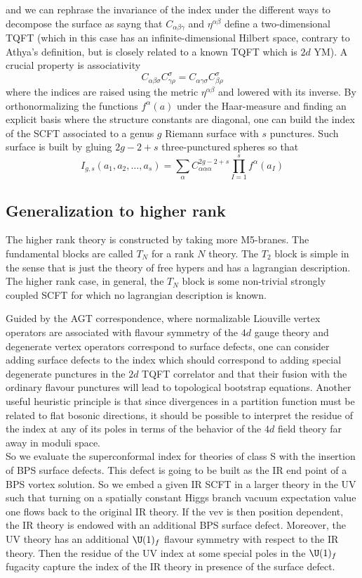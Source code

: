 and we can rephrase the invariance of the index under the different ways to decompose the surface as sayng that $C_{\alpha\beta\gamma}$ and $\eta^{\alpha\beta}$ define a two-dimensional TQFT (which in this case has an infinite-dimensional Hilbert space, contrary to Athya's definition, but is closely related to a known TQFT which is $2d$ YM). A crucial property is associativity
\begin{equation}
	C_{\alpha\beta\sigma}C^{\sigma}_{\gamma\rho}=C_{\alpha\gamma\sigma}C^{\sigma}_{\beta\rho}
\end{equation}
where the indices are raised using the metric $\eta^{\alpha\beta}$ and lowered with its inverse. By orthonormalizing the functions $f^{\alpha}(a)$ under the Haar-measure and finding an explicit basis where the structure constants are diagonal, one can build the index of the SCFT associated to a genus $g$ Riemann surface with $s$ punctures. Such surface is built by gluing $2g-2+s$ three-punctured spheres so that
\begin{equation}
	I_{g,s}(a_{1},a_{2},\ldots,a_{s})=\sum_{\alpha}C_{\alpha\alpha\alpha}^{2g-2+s}\prod_{I=1}^{s}f^{\alpha}(a_{I})
\end{equation}
\subsection{Generalization to higher rank}
The higher rank theory is constructed by taking more M5-branes. The fundamental blocks are called $T_{N}$ for a rank $N$ theory. The $T_{2}$ block is simple in the sense that is just the theory of free hypers and has a lagrangian description. The higher rank case, in general, the $T_{N}$ block is some non-trivial strongly coupled SCFT for which no lagrangian description is known.

Guided by the AGT correspondence, where normalizable Liouville vertex operators are associated with flavour symmetry of the $4d$ gauge theory and degenerate vertex operators correspond to surface defects, one can consider adding surface defects to the index which should correspond to adding special degenerate punctures in the $2d$ TQFT correlator and that their fusion with the ordinary flavour punctures will lead to topological bootstrap equations. Another useful heuristic principle is that since divergences in a partition function must be related to flat bosonic directions, it should be possible to interpret the residue of the index at any of its poles in terms of the behavior of the $4d$ field theory far away in moduli space.\\
So we evaluate the superconformal index for theories of class S with the insertion of BPS surface defects. This defect is going to be built as the IR end point of a BPS vortex solution. So we embed a given IR SCFT in a larger theory in the UV such that turning on a spatially constant Higgs branch vacuum expectation value one flows back to the original IR theory. If the vev is then position dependent, the IR theory is endowed with an additional BPS surface defect. Moreover, the UV theory has an additional $\U(1)_{f}$ flavour symmetry with respect to the IR theory. Then the residue of the UV index at some special poles in the $\U(1)_{f}$ fugacity capture the index of the IR theory in presence of the surface defect.

